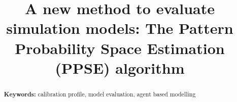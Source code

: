 \documentclass[10pt,a4paper]{article}
\theoremstyle{definition}
\theoremstyle{remark}
\begin{document}
\begin{abstract}


\noindent
\textbf{Keywords:} calibration profile, model evaluation, agent based modelling

\end{abstract}


\title{A new method to evaluate simulation models: The Pattern Probability Space Estimation (PPSE) algorithm}
\end{document}
